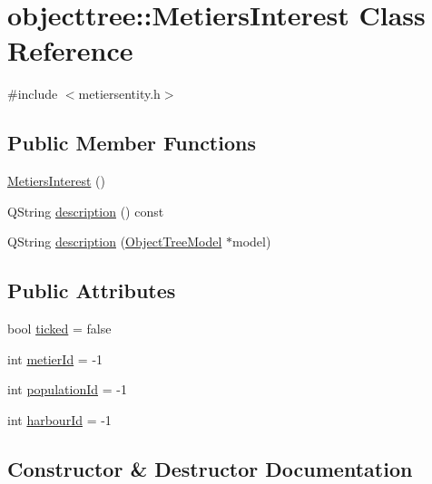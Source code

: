 \hypertarget{classobjecttree_1_1_metiers_interest}{}\section{objecttree\+::Metiers\+Interest Class Reference}
\label{classobjecttree_1_1_metiers_interest}


{\ttfamily \#include $<$metiersentity.\+h$>$}

\subsection*{Public Member Functions}
\begin{DoxyCompactItemize}
\item 
\mbox{\hyperlink{classobjecttree_1_1_metiers_interest_af12696382d35a7b3fbd9b61ccaec696f}{Metiers\+Interest}} ()
\item 
Q\+String \mbox{\hyperlink{classobjecttree_1_1_metiers_interest_a4fc5e06035633bd907ce1cf472e20f08}{description}} () const
\item 
Q\+String \mbox{\hyperlink{classobjecttree_1_1_metiers_interest_a1c753589505ad86803fcedec41d3d6c7}{description}} (\mbox{\hyperlink{class_object_tree_model}{Object\+Tree\+Model}} $\ast$model)
\end{DoxyCompactItemize}
\subsection*{Public Attributes}
\begin{DoxyCompactItemize}
\item 
bool \mbox{\hyperlink{classobjecttree_1_1_metiers_interest_abf5579af80379bf47f9f131ad7c99a9d}{ticked}} = false
\item 
int \mbox{\hyperlink{classobjecttree_1_1_metiers_interest_a440751653decc2488056a6259fc0e5e8}{metier\+Id}} = -\/1
\item 
int \mbox{\hyperlink{classobjecttree_1_1_metiers_interest_a24b79cb7e18f9ac296cc7b81df63ccc0}{population\+Id}} = -\/1
\item 
int \mbox{\hyperlink{classobjecttree_1_1_metiers_interest_a3ffd4272944188527b9519b1bab66f4f}{harbour\+Id}} = -\/1
\end{DoxyCompactItemize}


\subsection{Constructor \& Destructor Documentation}
\mbox{\label{classobjecttree_1_1_metiers_interest_af12696382d35a7b3fbd9b61ccaec696f}} 
